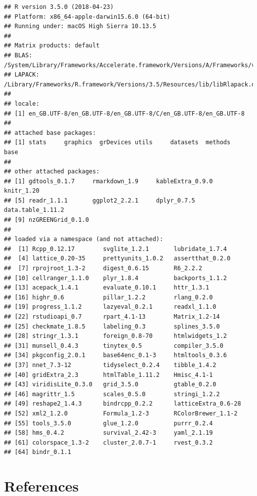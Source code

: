 \documentclass[]{article}
\begin{document}
\begin{verbatim}
## R version 3.5.0 (2018-04-23)
## Platform: x86_64-apple-darwin15.6.0 (64-bit)
## Running under: macOS High Sierra 10.13.5
## 
## Matrix products: default
## BLAS: /System/Library/Frameworks/Accelerate.framework/Versions/A/Frameworks/vecLib.framework/Versions/A/libBLAS.dylib
## LAPACK: /Library/Frameworks/R.framework/Versions/3.5/Resources/lib/libRlapack.dylib
## 
## locale:
## [1] en_GB.UTF-8/en_GB.UTF-8/en_GB.UTF-8/C/en_GB.UTF-8/en_GB.UTF-8
## 
## attached base packages:
## [1] stats     graphics  grDevices utils     datasets  methods   base     
## 
## other attached packages:
## [1] gdtools_0.1.7     rmarkdown_1.9     kableExtra_0.9.0  knitr_1.20       
## [5] readr_1.1.1       ggplot2_2.2.1     dplyr_0.7.5       data.table_1.11.2
## [9] nzGREENGrid_0.1.0
## 
## loaded via a namespace (and not attached):
##  [1] Rcpp_0.12.17        svglite_1.2.1       lubridate_1.7.4    
##  [4] lattice_0.20-35     prettyunits_1.0.2   assertthat_0.2.0   
##  [7] rprojroot_1.3-2     digest_0.6.15       R6_2.2.2           
## [10] cellranger_1.1.0    plyr_1.8.4          backports_1.1.2    
## [13] acepack_1.4.1       evaluate_0.10.1     httr_1.3.1         
## [16] highr_0.6           pillar_1.2.2        rlang_0.2.0        
## [19] progress_1.1.2      lazyeval_0.2.1      readxl_1.1.0       
## [22] rstudioapi_0.7      rpart_4.1-13        Matrix_1.2-14      
## [25] checkmate_1.8.5     labeling_0.3        splines_3.5.0      
## [28] stringr_1.3.1       foreign_0.8-70      htmlwidgets_1.2    
## [31] munsell_0.4.3       tinytex_0.5         compiler_3.5.0     
## [34] pkgconfig_2.0.1     base64enc_0.1-3     htmltools_0.3.6    
## [37] nnet_7.3-12         tidyselect_0.2.4    tibble_1.4.2       
## [40] gridExtra_2.3       htmlTable_1.11.2    Hmisc_4.1-1        
## [43] viridisLite_0.3.0   grid_3.5.0          gtable_0.2.0       
## [46] magrittr_1.5        scales_0.5.0        stringi_1.2.2      
## [49] reshape2_1.4.3      bindrcpp_0.2.2      latticeExtra_0.6-28
## [52] xml2_1.2.0          Formula_1.2-3       RColorBrewer_1.1-2 
## [55] tools_3.5.0         glue_1.2.0          purrr_0.2.4        
## [58] hms_0.4.2           survival_2.42-3     yaml_2.1.19        
## [61] colorspace_1.3-2    cluster_2.0.7-1     rvest_0.3.2        
## [64] bindr_0.1.1
\end{verbatim}

\section*{References}\label{references}
\end{document}
